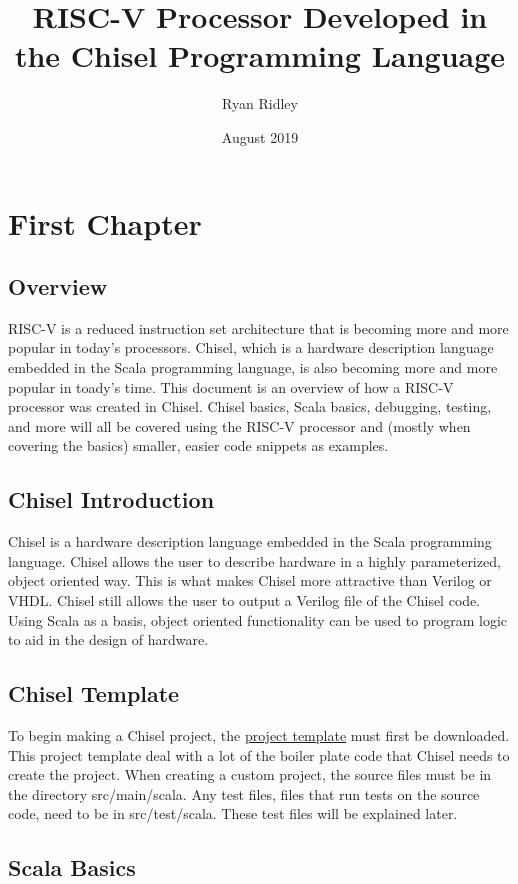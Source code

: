 \documentclass[12pt, letterpaper]{report}
\title{RISC-V Processor Developed in the Chisel Programming Language}
\author{Ryan Ridley}
\date{August 2019}
\begin{document}
\maketitle

\chapter{First Chapter}
 
\section{Overview}
RISC-V is a reduced instruction set architecture that is becoming more and more popular in today's processors. Chisel, which is a hardware 
description language embedded in the Scala programming language, is also becoming more and more popular in toady's time. This document is 
an overview of how a RISC-V processor was created in Chisel. Chisel basics, Scala basics, debugging, testing, and more will all be covered 
using the RISC-V processor and (mostly when covering the basics) smaller, easier code snippets as examples. 
\section{Chisel Introduction}
 
Chisel is a hardware description language embedded in the Scala programming language. Chisel allows the user to describe hardware in a
highly parameterized, object oriented way. This is what makes Chisel more attractive than Verilog or VHDL. Chisel still allows the user to
output a Verilog file of the Chisel code. Using Scala as a basis, object oriented functionality can be used to program logic to aid in the design
of hardware.
 
\section{Chisel Template}
 
To begin making a Chisel project, the \href{https://github.com/freechipsproject/chisel-template}{project template} must first be downloaded. 
This project template deal with a lot of the boiler plate code that Chisel needs to create the project.
When creating a custom project, the source files must be in the directory src/main/scala. Any test files, files that run tests on the source code, 
need to be in src/test/scala. These test files will be explained later.
 
\section{Scala Basics}
\end{document}
